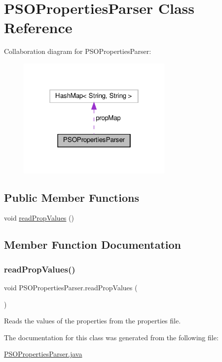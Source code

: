 \hypertarget{class_p_s_o_properties_parser}{}\section{P\+S\+O\+Properties\+Parser Class Reference}
\label{class_p_s_o_properties_parser}


Collaboration diagram for P\+S\+O\+Properties\+Parser\+:
\nopagebreak
\begin{figure}[H]
\begin{center}
\leavevmode
\includegraphics[width=214pt]{class_p_s_o_properties_parser__coll__graph}
\end{center}
\end{figure}
\subsection*{Public Member Functions}
\begin{DoxyCompactItemize}
\item 
void \hyperlink{class_p_s_o_properties_parser_ada14427c13fa9eb803da420099dcd0c6}{read\+Prop\+Values} ()
\end{DoxyCompactItemize}


\subsection{Member Function Documentation}
\mbox{\label{class_p_s_o_properties_parser_ada14427c13fa9eb803da420099dcd0c6}} 
\subsubsection{\texorpdfstring{read\+Prop\+Values()}{readPropValues()}}
{\footnotesize\ttfamily void P\+S\+O\+Properties\+Parser.\+read\+Prop\+Values (\begin{DoxyParamCaption}{ }\end{DoxyParamCaption})}

Reads the values of the properties from the properties file. 

The documentation for this class was generated from the following file\+:\begin{DoxyCompactItemize}
\item 
\hyperlink{_p_s_o_properties_parser_8java}{P\+S\+O\+Properties\+Parser.\+java}\end{DoxyCompactItemize}

